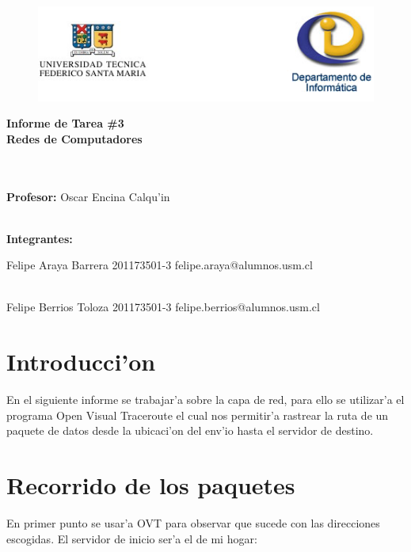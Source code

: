 \documentclass{article}
\begin{document}
\begin{figure}[htbp]
\includegraphics{logo_latex} 
\end{figure}

\textbf{\Huge{Informe de Tarea \#3}}\\[0.2cm]
\textbf{\Huge{Redes de Computadores}}
\\ \ \\ \

\begin{flushleft}
\large{\textbf{Profesor:}} 
\large{Oscar Encina Calqu'in} 
\\ \


\large{\textbf{Integrantes:}} \par
\large{Felipe Araya Barrera  201173501-3  felipe.araya@alumnos.usm.cl}\\ \

\large{Felipe Berrios Toloza  201173501-3 felipe.berrios@alumnos.usm.cl}\\

\end{flushleft}

\newpage

\section{Introducci'on}
En el siguiente informe se trabajar'a sobre la capa de red, para ello se utilizar'a el programa Open Visual Traceroute el cual nos permitir'a rastrear la ruta de un paquete de datos desde la ubicaci'on del env'io hasta el servidor de destino.

\section{Recorrido de los paquetes}
En primer punto se usar'a OVT para observar que sucede con las direcciones escogidas. El servidor de inicio ser'a el de mi hogar:
\end{document}
